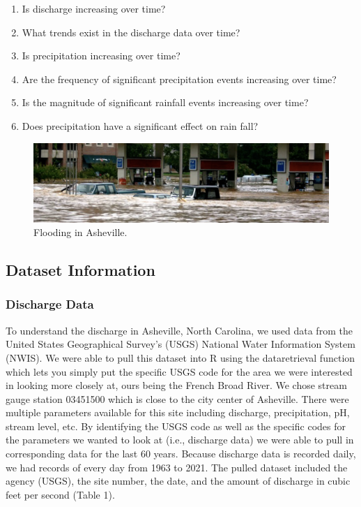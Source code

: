 \documentclass[
]{article}
\begin{document}
\begin{enumerate}
\def\labelenumi{\arabic{enumi}.}
\item
  Is discharge increasing over time?
\item
  What trends exist in the discharge data over time?
\item
  Is precipitation increasing over time?
\item
  Are the frequency of significant precipitation events increasing over
  time?
\item
  Is the magnitude of significant rainfall events increasing over time?
\item
  Does precipitation have a significant effect on rain fall?
\end{enumerate}

\begin{figure}
\includegraphics[width=1\linewidth]{Photo_2} \caption{Flooding in Asheville.}\label{fig:unnamed-chunk-2}
\end{figure}

\newpage

\hypertarget{dataset-information}{%
\subsection{\texorpdfstring{\textbf{Dataset
Information}}{Dataset Information}}\label{dataset-information}}

\hypertarget{discharge-data}{%
\subsubsection{\texorpdfstring{\textbf{Discharge
Data}}{Discharge Data}}\label{discharge-data}}

To understand the discharge in Asheville, North Carolina, we used data
from the United States Geographical Survey's (USGS) National Water
Information System (NWIS). We were able to pull this dataset into R
using the dataretrieval function which lets you simply put the specific
USGS code for the area we were interested in looking more closely at,
ours being the French Broad River. We chose stream gauge station
03451500 which is close to the city center of Asheville. There were
multiple parameters available for this site including discharge,
precipitation, pH, stream level, etc. By identifying the USGS code as
well as the specific codes for the parameters we wanted to look at
(i.e., discharge data) we were able to pull in corresponding data for
the last 60 years. Because discharge data is recorded daily, we had
records of every day from 1963 to 2021. The pulled dataset included the
agency (USGS), the site number, the date, and the amount of discharge in
cubic feet per second (Table 1).
\end{document}
